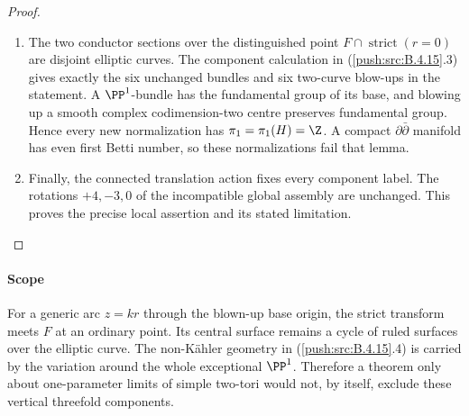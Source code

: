 \begin{proof}
\begin{enumerate}[label=\arabic*.,leftmargin=*]
\item The two conductor sections over the distinguished point
$F\cap\operatorname{strict}(r=0)$ are disjoint elliptic
curves. The component calculation in (\ref{push:src:B.4.15}.3) gives
exactly the six unchanged bundles and six two-curve
blow-ups in the statement. A $\PP^1$-bundle has the
fundamental group of its base, and blowing up a smooth
complex codimension-two centre preserves fundamental
group. Hence every new normalization has
$\pi_1=\pi_1(H)=\Z$. A compact
$\partial\bar\partial$ manifold has even first Betti
number, so these normalizations fail that lemma.

\item Finally, the connected translation action fixes every
component label. The rotations $+4,-3,0$ of the
incompatible global assembly are unchanged. This proves
the precise local assertion and its stated limitation.
\end{enumerate}
\end{proof}


\paragraph{Scope}
For a generic arc $z=kr$ through the blown-up base
origin, the strict transform meets $F$ at an ordinary
point. Its central surface remains a cycle of ruled
surfaces over the elliptic curve. The non-K\"ahler
geometry in (\ref{push:src:B.4.15}.4) is carried by the variation
around the whole exceptional $\PP^1$. Therefore a
theorem only about one-parameter limits of simple
two-tori would not, by itself, exclude these vertical
threefold components.




